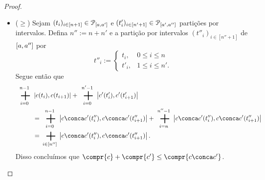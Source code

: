 \begin{proof}
\begin{itemize}
	\item ($\geq$) Sejam $(t_i)_{i \in [n+1]} \in \mathcal{P}_{\left[{a},{a'}\right]}$ e $(t'_i)_{i \in [n'+1]} \in \mathcal{P}_{\left[{a'},{a''}\right]}$ partições por intervalos. Defina $n'' := n+n'$ e a partição por intervalos $(t''_i)_{i \in [n''+1]}$ de $\left[{a},{a''}\right]$ por
		\begin{equation*}
		t''_i := \begin{cases}
				t_i,	& 0 \leq i \leq n \\
				t'_i,	& 1 \leq i \leq n'.
				\end{cases}
		\end{equation*}
	Segue então que
		\begin{align*}
		\sum_{i=0}^{n-1}& \dist{c(t_i)}{c(t_{i+1})} + \sum_{i=0}^{n'-1} \dist{c'(t'_i)}{c'(t'_{i+1})} \\
			&= \sum_{i=0}^{n-1} \dist{c \conca c'(t''_i)}{c \conca c'(t''_{i+1})} + \sum_{i=n}^{n''-1} \dist{c \conca c'(t''_i)}{c \conca c'(t''_{i+1})} \\
			&= \sum_{i \in [n'']} \dist{c \conca c'(t''_i)}{c \conca c'(t''_{i+1})}.
		\end{align*}
	Disso concluímos que $\compr{c} + \compr{c'} \leq \compr{c \conca c'}$.
	\end{itemize}
\end{proof}

